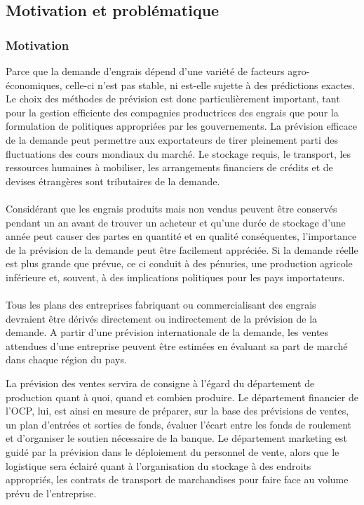 	\subsection{Motivation et problématique}
	\subsubsection{Motivation}
	Parce que la demande d'engrais dépend d'une variété de facteurs agro-économiques, celle-ci n’est pas stable, ni est-elle sujette à des prédictions exactes. Le choix des méthodes de prévision est donc particulièrement important, tant pour la gestion efficiente des compagnies productrices des engrais que pour la formulation de politiques appropriées par les gouvernements.
	La prévision efficace de la demande peut permettre aux exportateurs de tirer pleinement parti des fluctuations des cours mondiaux du marché. Le stockage requis, le transport, les ressources humaines à mobiliser, les arrangements financiers de crédits et de devises étrangères sont tributaires de la demande.
	\paragraph{}
	Considérant que les engrais produits mais non vendus peuvent être conservés pendant un an avant de trouver un acheteur et qu'une durée de stockage d'une année peut causer des partes en quantité et en qualité conséquentes, l'importance de la prévision de la demande peut être facilement appréciée. Si la demande réelle est plus grande que prévue, ce ci conduit à des pénuries, une production agricole inférieure et, souvent, à des implications politiques pour les pays importateurs.
	\paragraph{}
	Tous les plans des entreprises fabriquant ou commercialisant des engrais devraient être dérivés directement ou indirectement de la prévision de la demande. A partir d'une prévision internationale de la demande, les ventes attendues d'une entreprise peuvent être estimées en évaluant sa part de marché dans chaque région du pays.
	\par
	La prévision des ventes servira de consigne à l’égard du département de production quant à quoi, quand et combien produire. Le département financier de l'OCP, lui, est ainsi en mesure de préparer, sur la base des prévisions de ventes, un plan d'entrées et sorties de fonds, évaluer l'écart entre les fonds de roulement et d'organiser le soutien nécessaire de la banque. Le département marketing est guidé par la prévision dans le déploiement du personnel de vente, alors que le logistique sera éclairé quant à l’organisation du stockage à des endroits appropriés, les contrats de transport de marchandises pour faire face au volume prévu de l'entreprise.
